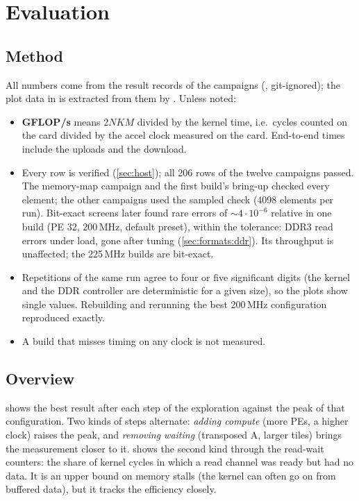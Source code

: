 \section{Evaluation}
\label{sec:eval}

\subsection{Method}
All numbers come from the result records of the campaigns (, git-ignored); the plot data in
 is extracted from them by . Unless noted:
\begin{itemize}
  \item \textbf{GFLOP/s} means \(2NKM\) divided by the kernel time, i.e.\ cycles counted on the card divided by the
        accel clock measured on the card. End-to-end times include the uploads and the download.
  \item Every row is verified (\cref{sec:host}); all 206 rows of the twelve campaigns passed. The memory-map campaign and the first build's
        bring-up checked every element; the other campaigns used the sampled check (4098 elements per run).
        Bit-exact screens later found rare errors of \(\sim\)\(4\cdot10^{-6}\) relative in one build (PE 32,
        200\,MHz, default preset), within the tolerance: DDR3 read errors under load, gone after tuning
        (\cref{sec:formats:ddr}). Its throughput is unaffected; the 225\,MHz builds are bit-exact.
  \item Repetitions of the same run agree to four or five significant digits (the kernel and the DDR controller are
        deterministic for a given size), so the plots show single values. Rebuilding and rerunning the best 200\,MHz
        configuration reproduced  exactly.
  \item A build that misses timing on any clock is not measured.
\end{itemize}

\subsection{Overview}
 shows the best result after each step of the exploration against the peak of that configuration.
Two kinds of steps alternate: \emph{adding compute} (more PEs, a higher clock) raises the peak, and \emph{removing
waiting} (transposed A, larger tiles) brings the measurement closer to it.  shows the second kind
through the read-wait counters: the share of kernel cycles in which a read channel was ready but had no data. It is an
upper bound on memory stalls (the kernel can often go on from buffered data), but it tracks the efficiency closely.

